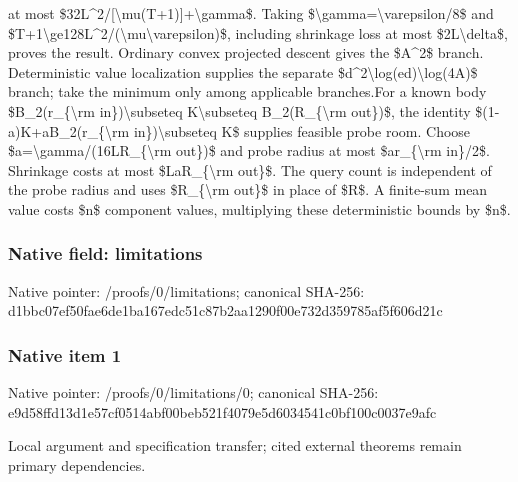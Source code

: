 \documentclass[10pt,a4paper]{article}
\begin{document}
at most \$32L\textasciicircum{}2/\allowbreak{}[\textbackslash{}mu(T+1)]+\textbackslash{}gamma\$. Taking \$\textbackslash{}gamma=\allowbreak{}\textbackslash{}varepsilon/\allowbreak{}8\$ and \$T+1\textbackslash{}ge128L\textasciicircum{}2/\allowbreak{}(\textbackslash{}mu\textbackslash{}varepsilon)\$,\allowbreak{} including shrinkage loss at most \$2L\textbackslash{}delta\$,\allowbreak{} proves the result. Ordinary convex projected descent gives the \$A\textasciicircum{}2\$ branch. Deterministic value localization supplies the separate \$d\textasciicircum{}2\textbackslash{}log(ed)\textbackslash{}log(4A)\$ branch;\allowbreak{} take the minimum only among applicable branches.\newline{}\newline{}For a known body \$B\_\allowbreak{}2(r\_\allowbreak{}\{\textbackslash{}rm in\})\textbackslash{}subseteq K\textbackslash{}subseteq B\_\allowbreak{}2(R\_\allowbreak{}\{\textbackslash{}rm out\})\$,\allowbreak{} the identity \$(1-a)K+aB\_\allowbreak{}2(r\_\allowbreak{}\{\textbackslash{}rm in\})\textbackslash{}subseteq K\$ supplies feasible probe room. Choose \$a=\allowbreak{}\textbackslash{}gamma/\allowbreak{}(16LR\_\allowbreak{}\{\textbackslash{}rm out\})\$ and probe radius at most \$ar\_\allowbreak{}\{\textbackslash{}rm in\}/\allowbreak{}2\$. Shrinkage costs at most \$LaR\_\allowbreak{}\{\textbackslash{}rm out\}\$. The query count is independent of the probe radius and uses \$R\_\allowbreak{}\{\textbackslash{}rm out\}\$ in place of \$R\$. A finite-sum mean value costs \$n\$ component values,\allowbreak{} multiplying these deterministic bounds by \$n\$.\par\endgroup

\subsubsection{Native field: limitations}
Native pointer: /proofs/0/limitations; canonical SHA-256: d1bbc07ef50fae6de1ba167edc51c87b2aa1290f00e732d359785af5f606d21c

\subsubsection{Native item 1}
Native pointer: /proofs/0/limitations/0; canonical SHA-256: e9d58ffd13d1e57cf0514abf00beb521f4079e5d6034541c0bf100c0037e9afc

\begingroup\raggedright\sloppy Local argument and specification transfer;\allowbreak{} cited external theorems remain primary dependencies.\par\endgroup
\end{document}
